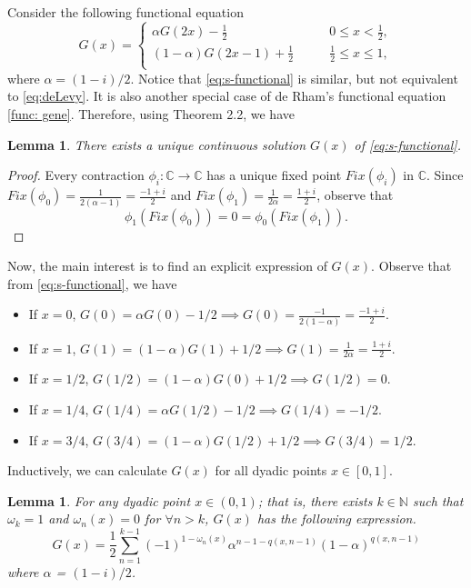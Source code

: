 \documentclass[epsf,10pt]{article}
\newtheorem{lemma}[theorem]{Lemma}
\begin{document}
\medskip
Consider the following functional equation
\begin{equation}
\label{eq:s-functional}
 G(x) =
\begin{cases}
 \alpha G(2x) - \frac{1}{2}
                     &\qquad 0 \leq x < \frac{1}{2}, \\
(1-\alpha) G(2x-1) + \frac{1}{2} & \qquad \frac{1}{2} \leq x \leq 1,\\
 
 \end{cases}
 \end{equation}
where $\alpha=(1-i)/2$.
Notice that \eqref{eq:s-functional} is similar, but not equivalent to \eqref{eq:deLevy}. It is also another special case of de Rham's functional equation \eqref{func: gene}. Therefore, using Theorem 2.2, we have 
 \begin{lemma}
There exists a unique continuous solution $G(x)$ of \eqref{eq:s-functional}.
\end{lemma}
\begin{proof}
Every contraction $\phi_i:\mathbb{C} \to \mathbb{C}$ has a unique fixed point $Fix(\phi_i)$ in $\mathbb{C}$. Since $Fix(\phi_0) =\frac{1}{2(\alpha-1)}= \frac{-1+i}{2}$ and $Fix(\phi_1) = \frac{1}{2\alpha}=\frac{1+i}{2}$, observe that 
$$\phi_1(Fix(\phi_0)) = 0 = \phi_0(Fix(\phi_1)).$$

\end{proof}
\bigskip
Now, the main interest is to find an explicit expression of $G(x)$. Observe that from \eqref{eq:s-functional}, we have
\begin{itemize}
\item If $x=0$, $G(0) = \alpha G(0) - 1/2 \implies G(0) = \frac{-1}{2(1-\alpha)} =\frac{-1+i}{2}$.

\item If $x=1$, $G(1) = (1-\alpha) G(1) + 1/2 \implies G(1) =\frac{1}{2\alpha}=\frac{1+i}{2}$.

\item If $x=1/2$, $G(1/2) = (1-\alpha) G(0) + 1/2 \implies G(1/2) =0$.

\item If $x=1/4$, $G(1/4) = \alpha G(1/2) - 1/2 \implies G(1/4)=-1/2$.

\item If $x=3/4$, $G(3/4) = (1-\alpha) G(1/2) + 1/2 \implies G(3/4) =1/2$.
\end{itemize}
Inductively, we can calculate $G(x)$ for all dyadic points $x \in [0,1]$. 

\begin{lemma}
\label{th:shiftedlevyexplicit}
For any dyadic point $x \in (0,1)$; that is, there exists $k\in \mathbb{N}$ such that $\omega_k=1$ and $\omega_n(x)=0$ for $\forall n> k$, $G(x)$ has the following expression. 
\begin{equation}
    \label{explicts-levy}
    G(x) = \frac{1}{2}\sum_{n=1}^{k-1}(-1)^{1-\omega_n(x)}\alpha^{n-1-q(x,n-1)}(1-\alpha)^{q(x,n-1)}
\end{equation}
where $\alpha$ = $(1-i)/2$.
\end{lemma} 
\end{document}
